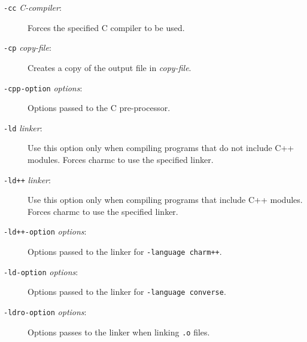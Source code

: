\begin{description}
\item[{\tt -cc} {\em C-compiler}:]

Forces the specified C compiler to be used.

\item[{\tt -cp} {\em copy-file}:]

Creates a copy of the output file in {\em copy-file}.

\item[{\tt -cpp-option} {\em options}:]

Options passed to the C pre-processor.

\item[{\tt -ld} {\em linker}:]

Use this option only when compiling programs that do not include C++
modules.  Forces charmc to use the specified linker.

\item[{\tt -ld++} {\em linker}:]

Use this option only when compiling programs that include C++
modules.  Forces charmc to use the specified linker.

\item[{\tt -ld++-option} {\em options}:]

Options passed to the linker for {\tt -language charm++}.

\item[{\tt -ld-option} {\em options}:]

Options passed to the linker for {\tt -language converse}.

\item[{\tt -ldro-option} {\em options}:]

Options passes to the linker when linking {\tt .o} files.


\end{description}
